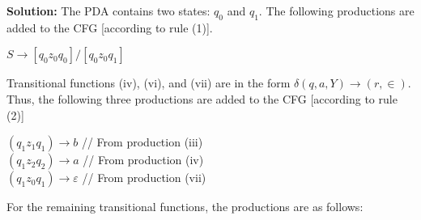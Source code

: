 \documentclass[9pt]{beamer}
\begin{document}
\begin{frame}
\textbf{Solution:} The PDA contains two states: $q_0$ and $q_1$. The following productions are added to the CFG
[according to rule (1)].\\
\begin{center}
  $S \rightarrow [q_0 z_0 q_0]/[q_0 z_0 q_1]$\\
\end{center}

\hspace*{0.5cm} Transitional functions (iv), (vi), and (vii) are in the form $\delta(q, a, Y) \rightarrow (r, \in)$. Thus, the following three
productions are added to the CFG [according to rule (2)]\\

\begin{center}
\hspace*{0.5cm} $(q_1 z_1 q_1) \rightarrow b$ // From production (iii) \\
\hspace*{0.5cm} $(q_1 z_2 q_2) \rightarrow a$ // From production (iv)\\
\hspace*{0.5cm} $(q_1 z_0 q_1) \rightarrow \varepsilon$ // From production (vii) \\
\end{center}

For the remaining transitional functions, the productions are as follows:\\
\end{frame}
\end{document}
